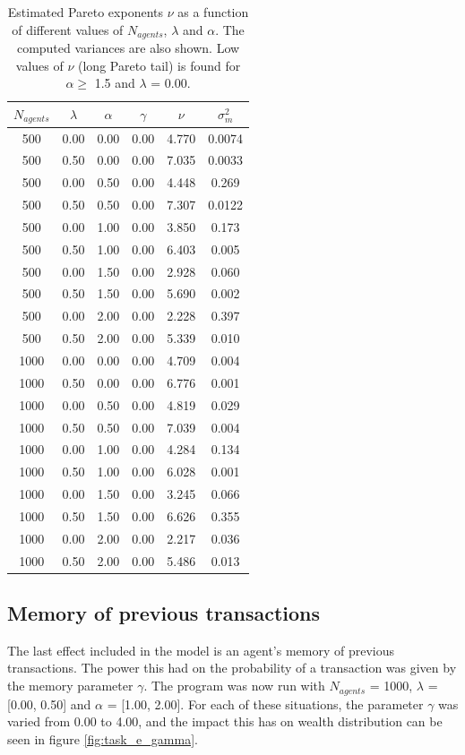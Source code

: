 \documentclass[11pt,a4paper,titlepage]{article}
\begin{document}
\begin{table}[h!]
\centering
\caption{Estimated Pareto exponents $\nu$ as a function of different values of $N_{agents}$, $\lambda$ and $\alpha$. The computed variances are also shown. Low values of $\nu$ (long Pareto tail) is found for $\alpha \geq$ 1.5 and $\lambda$ = 0.00.} \label{tab:nearest}
\begin{tabular}{| c | c | c | c | c | c |} \hline
\textbf{$N_{agents}$} & $\lambda$ & $\alpha$ & $\gamma$ &  $\nu$ & $\sigma^2_m$\\ \hline
500 & 0.00 & 0.00 & 0.00 & 4.770 & 0.0074 \\ \hline
500 & 0.50 & 0.00 & 0.00 & 7.035 & 0.0033 \\ \hline
500 & 0.00 & 0.50 & 0.00 & 4.448 & 0.269 \\ \hline
500 & 0.50 & 0.50 & 0.00 & 7.307 & 0.0122 \\ \hline
500 & 0.00 & 1.00 & 0.00 & 3.850 & 0.173 \\ \hline
500 & 0.50 & 1.00 & 0.00 & 6.403 & 0.005 \\ \hline
500 & 0.00 & 1.50 & 0.00 & 2.928 & 0.060  \\ \hline
500 & 0.50 & 1.50 & 0.00 & 5.690 & 0.002 \\ \hline
500 & 0.00 & 2.00 & 0.00 & 2.228 & 0.397 \\ \hline
500 & 0.50 & 2.00 & 0.00 & 5.339 & 0.010 \\ \hline
1000 & 0.00 & 0.00 & 0.00 & 4.709 & 0.004 \\ \hline
1000 & 0.50 & 0.00 & 0.00 & 6.776 & 0.001 \\ \hline
1000 & 0.00 & 0.50 & 0.00 & 4.819 & 0.029 \\ \hline
1000 & 0.50 & 0.50 & 0.00 & 7.039 & 0.004 \\ \hline
1000 & 0.00 & 1.00 & 0.00 & 4.284 & 0.134 \\ \hline
1000 & 0.50 & 1.00 & 0.00 & 6.028 & 0.001 \\ \hline
1000 & 0.00 & 1.50 & 0.00 & 3.245 & 0.066 \\ \hline
1000 & 0.50 & 1.50 & 0.00 & 6.626 & 0.355 \\ \hline
1000 & 0.00 & 2.00 & 0.00 & 2.217 & 0.036 \\ \hline
1000 & 0.50 & 2.00 & 0.00 & 5.486 & 0.013 \\ \hline

\end{tabular}
\end{table}


\subsection{Memory of previous transactions} 
The last effect included in the model is an agent's memory of previous transactions. The power this had on the probability of a transaction was given by the memory parameter $\gamma$. The program was now run with $N_{agents}$ = 1000, $\lambda$ = [0.00, 0.50] and $\alpha$ = [1.00, 2.00]. For each of these situations, the parameter $\gamma$ was varied from 0.00 to 4.00, and the impact this has on wealth distribution can be seen in figure \ref{fig:task_e_gamma}. 
\end{document}
